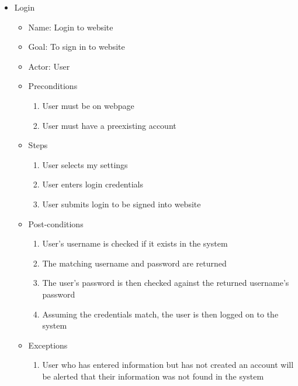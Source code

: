 \begin{itemize}
\item Login
	\begin{itemize}
	\item Name: Login to website
    \item Goal: To sign in to website
    \item Actor: User
    \item Preconditions
		\begin{enumerate}
		\item User must be on webpage
        \item User must have a preexisting account
        \end{enumerate}
    \item Steps
    	\begin{enumerate}
		\item User selects my settings
        \item User enters login credentials
        \item User submits login to be signed into website
        \end{enumerate}
    \item Post-conditions
		\begin{enumerate}
		\item User's username is checked if it exists in the system
        \item The matching username and password are returned 
        \item The user's password is then checked against the returned username's password
        \item Assuming the credentials match, the user is then logged on to the system
        \end{enumerate}
    \item Exceptions
    	\begin{enumerate} 
    	\item User who has entered information but has not created an account will be alerted that their information was not found in the system
        \end{enumerate}
    \end{itemize}
    

\end{itemize}
